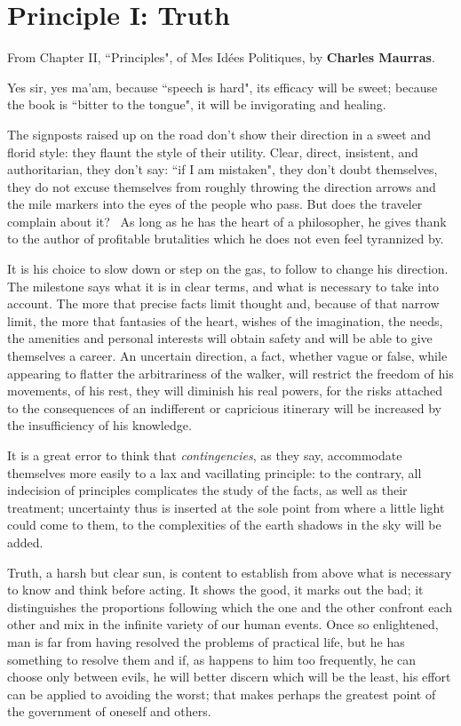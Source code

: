 \section{Principle I: Truth}

\begin{quotex}
From Chapter II, ``Principles", of Mes Idées Politiques, by \textbf{Charles Maurras}. 
\end{quotex}

Yes sir, yes ma'am, because ``speech is hard", its efficacy will be sweet; because the book is ``bitter to the tongue", it will be invigorating and healing.

The signposts raised up on the road don't show their direction in a sweet and florid style: they flaunt the style of their utility. Clear, direct, insistent, and authoritarian, they don't say: ``if I am mistaken", they don't doubt themselves, they do not excuse themselves from roughly throwing the direction arrows and the mile markers into the eyes of the people who pass. But does the traveler complain about it?  As long as he has the heart of a philosopher, he gives thank to the author of profitable brutalities which he does not even feel tyrannized by.

It is his choice to slow down or step on the gas, to follow to change his direction. The milestone says what it is in clear terms, and what is necessary to take into account. The more that precise facts limit thought and, because of that narrow limit, the more that fantasies of the heart, wishes of the imagination, the needs, the amenities and personal interests will obtain safety and will be able to give themselves a career. An uncertain direction, a fact, whether vague or false, while appearing to flatter the arbitrariness of the walker, will restrict the freedom of his movements, of his rest, they will diminish his real powers, for the risks attached to the consequences of an indifferent or capricious itinerary will be increased by the insufficiency of his knowledge.

It is a great error to think that \emph{contingencies}, as they say, accommodate themselves more easily to a lax and vacillating principle: to the contrary, all indecision of principles complicates the study of the facts, as well as their treatment; uncertainty thus is inserted at the sole point from where a little light could come to them, to the complexities of the earth shadows in the sky will be added.

Truth, a harsh but clear sun, is content to establish from above what is necessary to know and think before acting. It shows the good, it marks out the bad; it distinguishes the proportions following which the one and the other confront each other and mix in the infinite variety of our human events. Once so enlightened, man is far from having resolved the problems of practical life, but he has something to resolve them and if, as happens to him too frequently, he can choose only between evils, he will better discern which will be the least, his effort can be applied to avoiding the worst; that makes perhaps the greatest point of the government of oneself and others.

